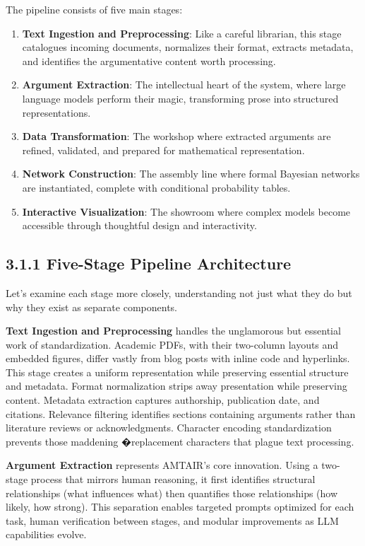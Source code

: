 \documentclass[
  11pt,
  letterpaper,
  openany]{book}
\providecommand{\tightlist}{%
  \setlength{\itemsep}{0pt}\setlength{\parskip}{0pt}}
\begin{document}
The pipeline consists of five main stages:

\begin{enumerate}
\def\labelenumi{\arabic{enumi}.}
\tightlist
\item
  \textbf{Text Ingestion and Preprocessing}: Like a careful librarian,
  this stage catalogues incoming documents, normalizes their format,
  extracts metadata, and identifies the argumentative content worth
  processing.
\item
  \textbf{Argument Extraction}: The intellectual heart of the system,
  where large language models perform their magic, transforming prose
  into structured representations.
\item
  \textbf{Data Transformation}: The workshop where extracted arguments
  are refined, validated, and prepared for mathematical representation.
\item
  \textbf{Network Construction}: The assembly line where formal Bayesian
  networks are instantiated, complete with conditional probability
  tables.
\item
  \textbf{Interactive Visualization}: The showroom where complex models
  become accessible through thoughtful design and interactivity.
\end{enumerate}

\subsection{3.1.1 Five-Stage Pipeline
Architecture}\label{sec-five-stage-pipeline}

Let's examine each stage more closely, understanding not just what they
do but why they exist as separate components.

\textbf{Text Ingestion and Preprocessing} handles the unglamorous but
essential work of standardization. Academic PDFs, with their two-column
layouts and embedded figures, differ vastly from blog posts with inline
code and hyperlinks. This stage creates a uniform representation while
preserving essential structure and metadata. Format normalization strips
away presentation while preserving content. Metadata extraction captures
authorship, publication date, and citations. Relevance filtering
identifies sections containing arguments rather than literature reviews
or acknowledgments. Character encoding standardization prevents those
maddening �replacement characters that plague text processing.

\textbf{Argument Extraction} represents AMTAIR's core innovation. Using
a two-stage process that mirrors human reasoning, it first identifies
structural relationships (what influences what) then quantifies those
relationships (how likely, how strong). This separation enables targeted
prompts optimized for each task, human verification between stages, and
modular improvements as LLM capabilities evolve.
\end{document}
